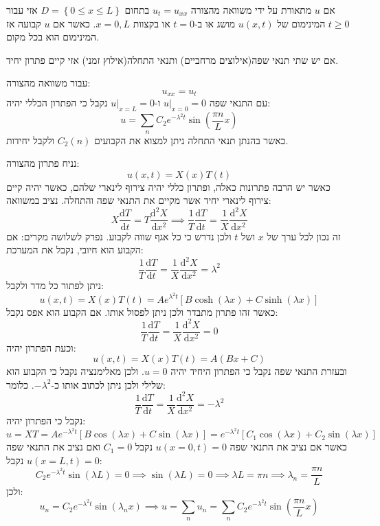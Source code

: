 \documentclass{tstextbook}
\begin{document}
\begin{proposition}
אם \(u\) מתאורת על ידי משוואה מהצורה \(u_{t}=u_{x x}\) בתחום \(D=\left\{  0\leq x\leq L  \right\}\) אזי עבור \(t\geq 0\) המינימום של \(u(x,t)\) מושג או ב-\(t=0\) או בקצוות \(x=0,L\). כאשר אם \(u\) קבועה אז המינימום הוא בכל מקום.

\end{proposition}
\begin{proposition}
אם יש שתי תנאי שפה(אילוצים מרחביים) ותנאי התחלה(אילוץ זמני) אזי קיים פתרון יחיד.

\end{proposition}
\begin{proposition}
עבור משוואה מהצורה:
$$u_{x x} = u_{t}$$
עם התנאי שפה \(u|_{x=0}=0\) ו-\(u|_{x=L}=0\) נקבל כי הפתרון הכללי יהיה:
$$u=\sum_{n}C_{2}e^{ -\lambda^{2}t }\sin\left( \frac{\pi n}{L}x \right)$$
כאשר בהנתן תנאי התחלה ניתן למצוא את הקבועים \(C_{2}(n)\) ולקבל יחידות.

\end{proposition}
\begin{example}
נניח פתרון מהצורה:
$$u(x,t)=X(x)T(t)$$
כאשר יש הרבה פתרונות כאלה, ופתרון כללי יהיה צירוף לינארי שלהם, כאשר יהיה קיים צירוף לינארי יחיד אשר מקיים את התנאי שפה והתחלה. נציב במשוואה:
$$X\frac{\mathrm{d} T}{\mathrm{d} t} =T\frac{\mathrm{d} ^{2}X}{\mathrm{d} x^{2}} \implies  \frac{1}{T}\frac{\mathrm{d} T}{\mathrm{d} t} =\frac{1}{X}\frac{\mathrm{d} ^{2}X}{\mathrm{d} x^{2}} $$
זה נכון לכל ערך של \(x\) ושל \(t\) ולכן נדרש כי כל אגף שווה לקבוע. נפרק לשלושה מקרים:
אם הקבוע הוא חיובי, נקבל את המערכת:
$$\frac{1}{T}\frac{\mathrm{d} T}{\mathrm{d} t} =\frac{1}{X}\frac{\mathrm{d} ^{2}X}{\mathrm{d} x^{2}} = \lambda^{2}$$
ניתן לפתור כל מדר ולקבל:
$$u(x,t)=X(x)T(t)=Ae^{ \lambda^{2}t }\left[ B\cosh\left( \lambda x \right)+C\sinh\left( \lambda x \right) \right]$$
כאשר זהו פתרון מתבדר ולכן ניתן לפסול אותו.
אם הקבוע הוא אפס נקבל:
$$\frac{1}{T}\frac{\mathrm{d} T}{\mathrm{d} t} =\frac{1}{X}\frac{\mathrm{d} ^{2}X}{\mathrm{d} x^{2}}=0$$
וכעת הפתרון יהיה:
$$u(x,t)=X(x)T(t)=A(Bx+C)$$
ובעזרת התנאי שפה נקבל כי הפתרון היחיד יהיה \(u=0\). ולכן מאלימנציה נקבל כי הקבוע הוא שלילי ולכן ניתן לכתוב אותו כ-\(-\lambda^{2}\). כלומר:
$$\frac{1}{T}\frac{\mathrm{d} T}{\mathrm{d} t} =\frac{1}{X}\frac{\mathrm{d} ^{2}X}{\mathrm{d} x^{2}}=-\lambda^{2}$$
נקבל כי הפתרון יהיה:
$$u=XT= Ae^{ -\lambda^{2} t }\left[ B\cos\left( \lambda x \right)+C\sin\left( \lambda x \right) \right]=e^{ -\lambda^{2}t }\left[ C_{1}\cos\left( \lambda x \right)+C_{2}\sin\left( \lambda x \right) \right]$$
כאשר אם נציב את התנאי שפה \(u(x=0,t)=0\) נקבל \(C_{1}=0\) ואם נציב את התנאי שפה \(u(x=L,t)=0\) נקבל:
$$C_{2}e^{ -\lambda^{2}t }\sin\left( \lambda L \right)=0\implies \sin\left( \lambda L \right)=0\implies \lambda L=\pi n\implies \lambda_{n}=\frac{\pi n}{L}$$
ולכן:
$$u_{n}=C_{2}e^{ -\lambda^{2}t }\sin\left( \lambda_{n}x \right)\implies u=\sum_{n} u_{n}=\sum_{n}C_{2}e^{ -\lambda^{2}t }\sin\left( \frac{\pi n}{L}x \right)$$

\end{example}
\end{document}
